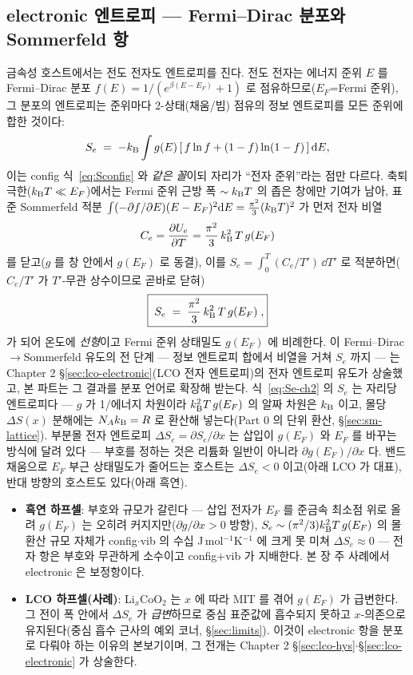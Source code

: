 \subsection{electronic 엔트로피 --- Fermi--Dirac 분포와 Sommerfeld 항}\label{ssec:elec}
금속성 호스트에서는 전도 전자도 엔트로피를 진다. 전도 전자는 에너지 준위 $E$ 를 Fermi--Dirac 분포
$f(E)=1/(e^{\beta(E-E_F)}+1)$ 로 점유하므로($E_F$=Fermi 준위), 그 분포의 엔트로피는 준위마다 2-상태(채움/빔)
점유의 정보 엔트로피를 모든 준위에 합한 것이다:
\begin{equation}
S_e \;=\; -k_{\mathrm B}\int g(E)\,[\,f\ln f+(1-f)\ln(1-f)\,]\,\mathrm{d} E,
\label{eq:Se_start}
\end{equation}
이는 config 식~\eqref{eq:Sconfig} 와 \emph{같은 꼴}이되 자리가 ``전자 준위''라는 점만 다르다. 축퇴 극한($k_{\mathrm B}
T\ll E_F$)에서는 Fermi 준위 근방 폭 $\sim k_{\mathrm B} T$ 의 좁은 창에만 기여가 남아, 표준 Sommerfeld 적분
$\int(-\partial f/\partial E)(E-E_F)^2\mathrm{d} E=\tfrac{\pi^2}{3}(k_{\mathrm B} T)^2$ 가 먼저 전자 비열
\[
C_e=\frac{\partial U_e}{\partial T}=\frac{\pi^2}{3}\,k_{\mathrm B}^2\,T\,g(E_F)
\]
를 닫고($g$ 를 창 안에서 $g(E_F)$ 로 동결), 이를 $S_e=\int_0^T (C_e/T')\,\dd T'$ 로 적분하면($C_e/T'$ 가
$T'$-무관 상수이므로 곧바로 닫혀)
\begin{equation}
\boxed{\;S_e \;=\; \frac{\pi^2}{3}\,k_{\mathrm B}^2\,T\,g(E_F)\;,}
\label{eq:Se-ch2}
\end{equation}
가 되어 온도에 \emph{선형}이고 Fermi 준위 상태밀도 $g(E_F)$ 에 비례한다. 이 Fermi--Dirac$\to$Sommerfeld
유도의 전 단계 --- 정보 엔트로피 합에서 비열을 거쳐 $S_e$ 까지 --- 는 Chapter 2 \S\ref{sec:lco-electronic}(LCO 전자 엔트로피)의 전자
엔트로피 유도가 상술했고, 본 파트는 그 결과를 분포 언어로 확장해 받는다. 식~\eqref{eq:Se-ch2} 의 $S_e$ 는 자리당
엔트로피다 --- $g$ 가 1/에너지 차원이라 $k_{\mathrm B}^2 T\,g(E_F)$ 의 알짜 차원은 $k_{\mathrm B}$ 이고, 몰당 $\Delta S(x)$ 분해에는
$N_Ak_{\mathrm B}=R$ 로 환산해 넣는다(Part 0 의 단위 환산, \S\ref{sec:sm-lattice}). 부분몰 전자 엔트로피 $\Delta S_e=\partial S_e/\partial x$
는 삽입이 $g(E_F)$ 와 $E_F$ 를 바꾸는 방식에 달려 있다 --- 부호를 정하는 것은 리튬화 일반이 아니라
$\partial g(E_F)/\partial x$ 다. 밴드 채움으로 $E_F$ 부근 상태밀도가 줄어드는 호스트는 $\Delta S_e<0$
이고(아래 LCO 가 대표), 반대 방향의 호스트도 있다(아래 흑연).
\begin{itemize}[leftmargin=1.4em,itemsep=1pt]
\item \textbf{흑연 하프셀}: 부호와 규모가 갈린다 --- 삽입 전자가 $E_F$ 를 준금속 최소점 위로 올려
$g(E_F)$ 는 오히려 커지지만($\partial g/\partial x>0$ 방향), $S_e\sim(\pi^2/3)k_{\mathrm B}^2T\,g(E_F)$ 의 몰 환산
규모 자체가 config$\cdot$vib 의 수십 J\,mol$^{-1}$K$^{-1}$ 에 크게 못 미쳐 $\Delta S_e\approx0$ --- 전자
항은 부호와 무관하게 소수이고 config$+$vib 가 지배한다. 본 장 주 사례에서 electronic 은 보정항이다.
\item \textbf{LCO 하프셀(사례)}: Li$_x$CoO$_2$ 는 $x$ 에 따라 MIT 를 겪어 $g(E_F)$ 가 급변한다. 그 전이 폭
안에서 $\Delta S_e$ 가 \emph{급변}하므로 중심 표준값에 흡수되지 못하고 $x$-의존으로 유지된다(중심 흡수 근사의
예외 코너, \S\ref{sec:limits}). 이것이 electronic 항을 분포로 다뤄야 하는 이유의 본보기이며, 그 전개는
Chapter 2 \S\ref{sec:lco-hys}$\cdot$\S\ref{sec:lco-electronic} 가 상술한다.
\end{itemize}

